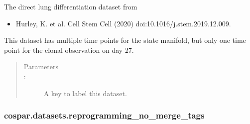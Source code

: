 \documentclass[letterpaper,10pt,english]{sphinxmanual}
\begin{document}
\begin{fulllineitems}
\label{\detokenize{cospar.datasets.lung:cospar.datasets.lung}}
The direct lung differentiation dataset from
\begin{itemize}
\item {} 
Hurley, K. et al. Cell Stem Cell (2020) doi:10.1016/j.stem.2019.12.009.

\end{itemize}

This dataset has multiple time points for the state manifold, but only one time point
for the clonal observation on day 27.
\begin{quote}\begin{description}
\item[{Parameters}] \leavevmode\item[{ : }] \leavevmode
A key to label this dataset.


\end{description}\end{quote}

\end{fulllineitems}



\subsubsection{cospar.datasets.reprogramming\_no\_merge\_tags}
\label{\detokenize{cospar.datasets.reprogramming_no_merge_tags:cospar-datasets-reprogramming-no-merge-tags}}\label{\detokenize{cospar.datasets.reprogramming_no_merge_tags::doc}}
\end{document}
